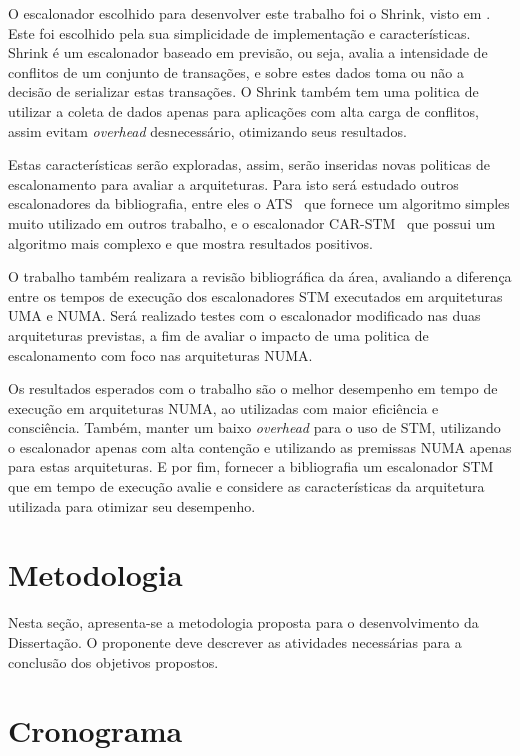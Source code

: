 \documentclass[diss-proposta,nocipinfo]{texufpel}
\begin{document}
O escalonador escolhido para desenvolver este trabalho foi o Shrink, visto em \cite{dragojevic09}. Este foi escolhido pela sua simplicidade de implementação e características. Shrink é um escalonador baseado em previsão, ou seja, avalia a intensidade de conflitos de um conjunto de transações, e sobre estes dados toma ou não a decisão de serializar estas transações. O Shrink também tem uma politica de utilizar a coleta de dados apenas para aplicações com alta carga de conflitos, assim evitam \emph{overhead} desnecessário, otimizando seus resultados.

Estas características serão exploradas, assim, serão inseridas novas politicas de escalonamento para avaliar a arquiteturas. Para isto será estudado outros escalonadores da bibliografia, entre eles o ATS~\cite{yoo08} que fornece um algoritmo simples muito utilizado em outros trabalho, e o escalonador CAR-STM~\cite{dolev08} que possui um algoritmo mais complexo e que mostra resultados positivos.

O trabalho também realizara a revisão bibliográfica da área, avaliando a diferença entre os tempos de execução dos escalonadores STM executados em arquiteturas UMA e NUMA. Será realizado testes com o escalonador modificado nas duas arquiteturas previstas, a fim de avaliar o impacto de uma politica de escalonamento com foco nas arquiteturas NUMA.

Os resultados esperados com o trabalho são o melhor desempenho em tempo de execução em arquiteturas NUMA, ao utilizadas com maior eficiência e consciência. Também, manter um baixo \emph{overhead} para o uso de STM, utilizando o escalonador apenas com alta contenção e utilizando as premissas NUMA apenas para estas arquiteturas. E por fim, fornecer a bibliografia um escalonador STM que em tempo de execução avalie e considere as características da arquitetura utilizada para otimizar seu desempenho.

\chapter{Metodologia}

Nesta seção, apresenta-se a metodologia proposta para o
desenvolvimento da Dissertação. O proponente deve descrever as
atividades necessárias para a conclusão dos objetivos propostos.

\chapter{Cronograma}
\end{document}

